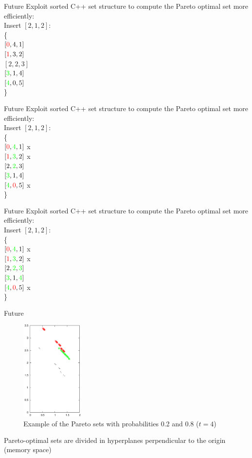 \documentclass{beamer}
\begin{document}
\begin{frame}{Future}
	Exploit sorted C++ set structure to compute the Pareto optimal set more
	efficiently:\\
	Insert $[2, 1, 2]$:\\
	\{\\
	$[{\color{red}0}, 4, 1]$\\
	$[{\color{red}1}, 3, 2]$\\
	$[2, 2, 3]$\\
	$[{\color{green}3}, 1, 4]$\\
	$[{\color{green}4}, 0, 5]$\\
	\}
\end{frame}


\begin{frame}{Future}
	Exploit sorted C++ set structure to compute the Pareto optimal set more
	efficiently:\\
	Insert $[2, 1, 2]$:\\
	\{\\
	$[{\color{red}0}, {\color{green}4}, 1]$ x\\
	$[{\color{red}1}, {\color{green}3}, 2]$ x\\
	$[2, {\color{green}2}, 3]$\\
	$[{\color{green}3}, 1, 4]$\\
	$[{\color{green}4}, {\color{red}0}, 5]$ x\\
	\}
\end{frame}


\begin{frame}{Future}
	Exploit sorted C++ set structure to compute the Pareto optimal set more
	efficiently:\\
	Insert {\color{red}$[2, 1, 2]$}:\\
	\{\\
	$[{\color{red}0}, {\color{green}4}, 1]$ x\\
	$[{\color{red}1}, {\color{green}3}, 2]$ x\\
	$[2, {\color{green}2}, {\color{green}3}]$\\
	$[{\color{green}3}, 1, {\color{green}4}]$\\
	$[{\color{green}4}, {\color{red}0}, 5]$ x\\
	\}
\end{frame}


\begin{frame}{Future}
	\begin{figure}
		\centering
		\includegraphics[height=5cm]{../../images/t4_28}
		\caption{Example of the Pareto sets with probabilities 0.2 and 0.8 ($t=4$)}
		\label{fig:t4_28}
	\end{figure}
	Pareto-optimal sets are divided in hyperplanes perpendicular to the origin
	(memory space)
\end{frame}
\end{document}
